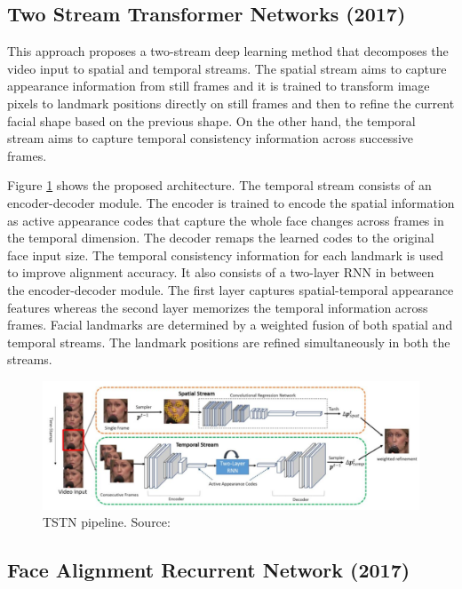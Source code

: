 \documentclass{llncs}
\begin{document}
\subsection{Two Stream Transformer Networks (2017) \cite{tstn}}

This approach proposes a two-stream deep learning method that decomposes the video input to spatial and temporal streams. The spatial stream aims to capture appearance information from still frames and it is trained to transform image pixels to landmark positions directly on still frames and then to refine the current facial shape based on the previous shape. On the other hand, the temporal stream aims to capture temporal consistency information across successive frames. 

Figure \ref{TSTN} shows the proposed architecture. The temporal stream consists of an encoder-decoder module. The encoder is trained to encode the spatial information as active appearance codes that capture the whole face changes across frames in the temporal dimension. The decoder remaps the learned codes to the original face input size. The temporal consistency information for each landmark is used to improve alignment accuracy. It also consists of a two-layer RNN in between the encoder-decoder module. The first layer captures spatial-temporal appearance features whereas the second layer memorizes the temporal information across frames. Facial landmarks are determined by a weighted fusion of both spatial and temporal streams. The landmark positions are refined simultaneously in both the streams. 

\begin{figure}
\centering
\includegraphics[scale=0.5]{Media/TSTN}
\caption{TSTN pipeline. Source:\cite{tstn}}
\label{TSTN}
\end{figure}




\subsection{Face Alignment Recurrent Network (2017) \cite{farn}}
\end{document}
